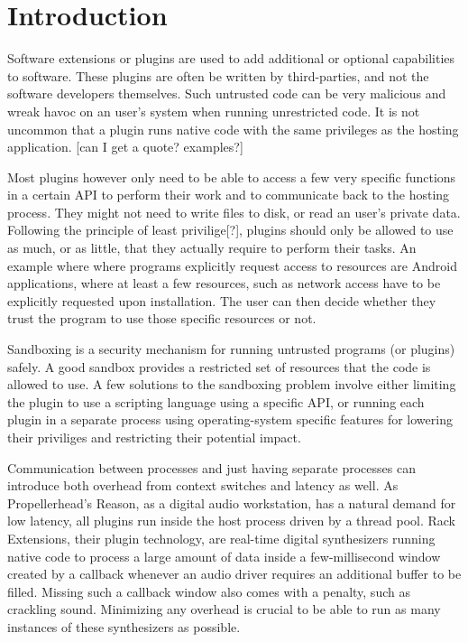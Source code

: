 \chapter {Introduction}

Software extensions or plugins are used to add additional or optional
capabilities to software. These plugins are often be written by third-parties,
and not the software developers themselves. Such untrusted code can be very
malicious and wreak havoc on an user's system when running unrestricted code. It
is not uncommon that a plugin runs native code with the same privileges as the
hosting application. [can I get a quote? examples?]

Most plugins however only need to be able to access a few very specific
functions in a certain API to perform their work and to communicate back to the
hosting process. They might not need to write files to disk, or read an user's
private data. Following the principle of least privilige[?], plugins should only
be allowed to use as much, or as little, that they actually require to perform
their tasks. An example where where programs explicitly request access to
resources are Android applications, where at least a few resources, such as
network access have to be explicitly requested upon installation. The user can
then decide whether they trust the program to use those specific resources or
not.

Sandboxing is a security mechanism for running untrusted programs (or plugins)
safely. A good sandbox provides a restricted set of resources that the code is
allowed to use. A few solutions to the sandboxing problem involve either
limiting the plugin to use a scripting language using a specific API, or running
each plugin in a separate process using operating-system specific features for
lowering their priviliges and restricting their potential impact.

Communication between processes and just having separate processes can introduce
both overhead from context switches and latency as well. As Propellerhead's
Reason, as a digital audio workstation, has a natural demand for low latency,
all plugins run inside the host process driven by a thread pool. Rack
Extensions, their plugin technology, are real-time digital synthesizers running
native code to process a large amount of data inside a few-millisecond window
created by a callback whenever an audio driver requires an additional buffer to
be filled. Missing such a callback window also comes with a penalty, such as
crackling sound. Minimizing any overhead is crucial to be able to run as many
instances of these synthesizers as possible.

